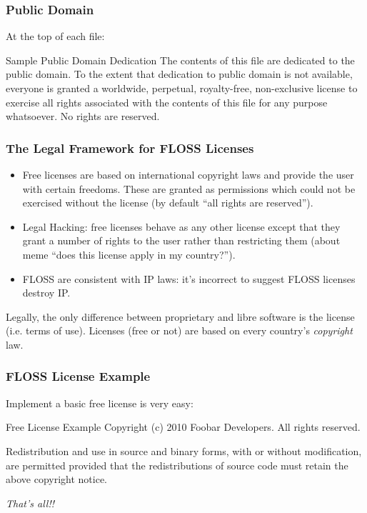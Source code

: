 
\begin{frame}
\frametitle{Public Domain}

At the top of each file:
\begin{block}{Sample Public Domain Dedication}
The contents of this file are dedicated to the public domain. To the extent that dedication to public domain is not available, everyone is granted a worldwide, perpetual, royalty-free, non-exclusive license to exercise all rights associated with the contents of this file for any purpose whatsoever. No rights are reserved.
\end{block}

\end{frame}

\begin{frame}
\frametitle{The Legal Framework for FLOSS Licenses}
\begin{itemize}
\item Free licenses are based on international copyright laws and provide the user with certain freedoms. These are granted as permissions which \alert{could not be exercised} without the license (by default ``all rights are reserved'').
\item \alert{Legal Hacking:} free licenses behave as any other license except that they grant a number of rights to the user rather than restricting them (about meme ``does this license apply in my country?'').
\item FLOSS are consistent with IP laws: it's incorrect to suggest FLOSS licenses destroy IP.
\end{itemize}

\alert{Legally, the only difference between proprietary and libre software is the license (i.e. terms of use). Licenses (free or not) are based on every country's \textit{copyright} law.}

\end{frame}


\begin{frame}
\frametitle{FLOSS License Example}

Implement a basic free license is very easy: 

\begin{block}{Free License Example}
Copyright (c) 2010 Foobar Developers. All rights reserved. 

\medskip
Redistribution and use in source and binary forms, with or without modification, are permitted provided that the redistributions of source code must retain the above copyright notice.
\end{block}

\textit{That's all!!}

\end{frame}

